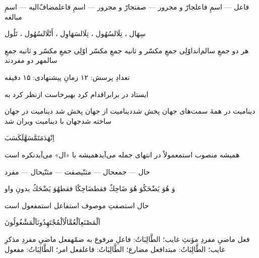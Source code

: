 {فاعل — اسمِ فاعل}{جارّ و مجرور — صفت}{جارّ و مجرور — اسمِ فاعل}{مضافٌ‌الیه — اسمِ مبالغه}

{سِهَال ، تِلَال}{سُهُول ، تِلَال}{سَهَاوِل ، أَتْلَال}{سُهُول ، تَلُول}

{هر دو جمعِ سالم‌اند}{اوّلِی جمعِ مکسّر و ثانیه جمعِ مکسّر}
{اوّلِی جمعِ مکسّر و ثانیه جمعِ سالم}{هر دو مفردند}

{\JUIFont\small\color{JMuted}تعدادِ پرسش: ۱۲ \quad\textbullet\quad زمانِ
پیشنهادی: ۱۵ دقیقه\par}
\JResetQ

{ایستاد در برابر}{اقدام کرد به}{برخاست از}{نظر کرد به}

{دینامیت در همهٔ سمت‌های جهان پخش شد}{دینامیت از جهان پخش شد}
{دینامیت در جهان ساخته شد}{جهان با دینامیت ویران شد}

{اِنْهَدَمَ}{تَمَّ}{سَهَّلَ}{كَسَبَ}

{همیشه منصوب است}{معمولاً در انتهای جمله می‌آید}{همیشه با «ال» می‌آید}{نکره است}

{حال — جمع}{حال — مثنّی}{صفت — مثنّی}{حال — مفرد}

{وَ هُوَ يَضْحَكُ}{وَ هُوَ ضَاحِكٌ فقط}{ضَاحِكًا فقط}{هُوَ يَضْحَكُ بدونِ واو}

{حال است}{صفتِ موصوف است}{فاعل است}{مفعول است}

{اَلْمَصْنَعِ}{اَلْعُمَّالُ}{اَلْمُجْتَهِدُونَ}{اَلْمَشْغُولُونَ}

{فعل ماضیِ مفردِ مؤنثِ غایب؛ الطَّالِبَاتُ: فاعلِ مرفوع به ضمّه}{فعل ماضیِ
مفردِ مذکرِ غایب؛ الطَّالِبَاتُ: مبتدا}{فعل مضارع؛ الطَّالِبَاتُ: فاعل}{فعل
امر؛ الطَّالِبَاتُ: مفعول}

